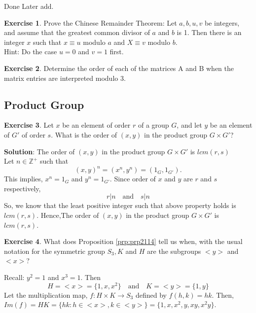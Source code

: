 \documentclass[
]{book}
\theoremstyle{definition}
\theoremstyle{definition}
\theoremstyle{definition}
\newtheorem{exercise}{Exercise}[chapter]
\theoremstyle{definition}
\theoremstyle{remark}
\begin{document}
Done Later add.

\begin{exercise}
\protect\hypertarget{exr:unnamed-chunk-145}{}\label{exr:unnamed-chunk-145}Prove the Chinese Remainder Theorem: Let \(a, b, u, v\) be integers, and assume that the greatest common divisor of \(a\) and \(b\) is 1. Then there is an integer \(x\) such that \(x \equiv u\) modulo \(a\) and \(X \equiv v\) modulo \(b\).\\
Hint: Do the case \(u = 0\) and \(v = 1\) first.
\end{exercise}

\begin{exercise}
\protect\hypertarget{exr:unnamed-chunk-146}{}\label{exr:unnamed-chunk-146}Determine the order of each of the matrices A and B when the matrix entries are interpreted modulo 3.
\end{exercise}

\hypertarget{product-group}{%
\subsection{Product Group}\label{product-group}}

\begin{exercise}
\protect\hypertarget{exr:unnamed-chunk-147}{}\label{exr:unnamed-chunk-147}Let \(x\) be an element of order \(r\) of a group \(G\), and let \(y\) be an element of \(G'\) of order \(s\). What is the order of \((x, y)\) in the product group \(G \times G'\)?
\end{exercise}

\textbf{Solution}: The order of \((x, y)\) in the product group \(G \times G'\) is \(lcm(r,s)\)\\
Let \(n\in \mathbb{Z}^+\) such that \[(x,y)^n=(x^n,y^n)=(1_G,1_{G'}).\]
This implies, \(x^n=1_G\) and \(y^n=1_{G'}\). Since order of \(x\) and \(y\) are \(r\) and \(s\) respectively,
\[r|n~~~\text{ and }~~~s|n\]
So, we know that the least positive integer such that above property holds is \(lcm(r,s)\). Hence,The order of \((x, y)\) in the product group \(G \times G'\) is \(lcm(r,s)\).

\begin{exercise}
\protect\hypertarget{exr:unnamed-chunk-148}{}\label{exr:unnamed-chunk-148}What does Proposition \ref{prp:prp2114} tell us when, with the usual notation for the symmetric
group \(S_3,K\) and \(H\) are the subgroups \(<y>\) and \(<x>\)?
\end{exercise}

Recall: \(y^2=1\) and \(x^3=1\). Then
\[H=<x>=\{1,x,x^2\}~~~\text{ and }~~~ K=<y>=\{1,y\}\]
Let the multiplication map, \(f:H\times K \to S_3\) defined by \(f(h,k)=hk\). Then,
\(Im(f)=HK=\{hk:h\in <x>, k\in <y>\}=\{1,x,x^2,y,xy,x^2y\}\).
\end{document}
